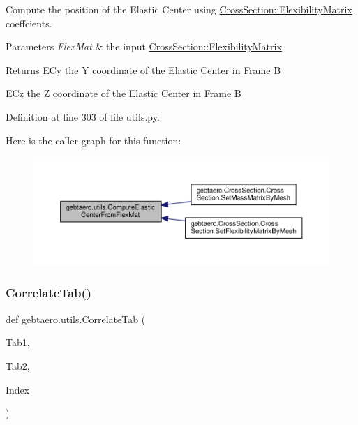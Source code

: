Compute the position of the Elastic Center using \hyperlink{classgebtaero_1_1_cross_section_1_1_cross_section_ac20eafaf38ff757f9a8c9ae89212396a}{Cross\+Section\+::\+Flexibility\+Matrix} coeffcients. 


\begin{DoxyParams}{Parameters}
{\em Flex\+Mat} & the input \hyperlink{classgebtaero_1_1_cross_section_1_1_cross_section_ac20eafaf38ff757f9a8c9ae89212396a}{Cross\+Section\+::\+Flexibility\+Matrix} \\
\hline
\end{DoxyParams}
\begin{DoxyReturn}{Returns}
E\+Cy the Y coordinate of the Elastic Center in \hyperlink{namespacegebtaero_1_1_frame}{Frame} B 

E\+Cz the Z coordinate of the Elastic Center in \hyperlink{namespacegebtaero_1_1_frame}{Frame} B 
\end{DoxyReturn}


Definition at line 303 of file utils.\+py.

Here is the caller graph for this function\+:\nopagebreak
\begin{figure}[H]
\begin{center}
\leavevmode
\includegraphics[width=350pt]{namespacegebtaero_1_1utils_ac3a921856ec921436caee59af0838d06_icgraph}
\end{center}
\end{figure}
\mbox{\label{namespacegebtaero_1_1utils_a49dfe8af29c3ae64bc75195f0a88a1ce}} 
\subsubsection{\texorpdfstring{Correlate\+Tab()}{CorrelateTab()}}
{\footnotesize\ttfamily def gebtaero.\+utils.\+Correlate\+Tab (\begin{DoxyParamCaption}\item[{}]{Tab1,  }\item[{}]{Tab2,  }\item[{}]{Index }\end{DoxyParamCaption})}



